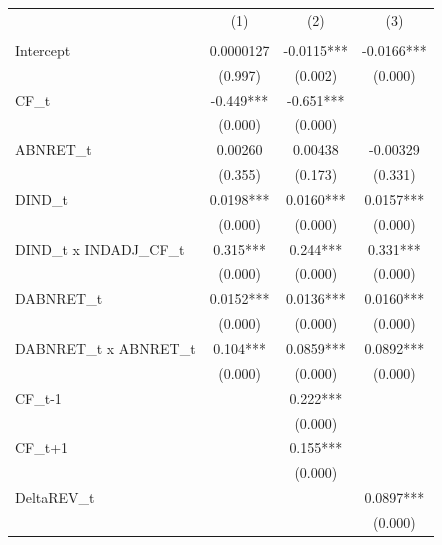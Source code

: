{
\def\sym#1{\ifmmode^{#1}\else\(^{#1}\)\fi}
\begin{tabular}{l*{3}{c}}
\hline\hline
                    &\multicolumn{1}{c}{(1)}&\multicolumn{1}{c}{(2)}&\multicolumn{1}{c}{(3)}\\
                    &\multicolumn{1}{c}{}&\multicolumn{1}{c}{}&\multicolumn{1}{c}{}\\
\hline
Intercept           &   0.0000127   &     -0.0115***&     -0.0166***\\
                    &     (0.997)   &     (0.002)   &     (0.000)   \\
[1em]
CF\_t                &      -0.449***&      -0.651***&               \\
                    &     (0.000)   &     (0.000)   &               \\
[1em]
ABNRET\_t            &     0.00260   &     0.00438   &    -0.00329   \\
                    &     (0.355)   &     (0.173)   &     (0.331)   \\
[1em]
DIND\_t              &      0.0198***&      0.0160***&      0.0157***\\
                    &     (0.000)   &     (0.000)   &     (0.000)   \\
[1em]
DIND\_t x INDADJ\_CF\_t&       0.315***&       0.244***&       0.331***\\
                    &     (0.000)   &     (0.000)   &     (0.000)   \\
[1em]
DABNRET\_t           &      0.0152***&      0.0136***&      0.0160***\\
                    &     (0.000)   &     (0.000)   &     (0.000)   \\
[1em]
DABNRET\_t x ABNRET\_t&       0.104***&      0.0859***&      0.0892***\\
                    &     (0.000)   &     (0.000)   &     (0.000)   \\
[1em]
CF\_{t-1}            &               &       0.222***&               \\
                    &               &     (0.000)   &               \\
[1em]
CF\_{t+1}            &               &       0.155***&               \\
                    &               &     (0.000)   &               \\
[1em]
DeltaREV\_t          &               &               &      0.0897***\\
                    &               &               &     (0.000)   \\

\end{tabular}}
